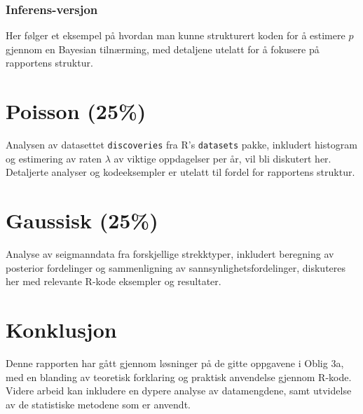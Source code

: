 \documentclass{article}
\begin{document}
\subsubsection*{Inferens-versjon}
Her følger et eksempel på hvordan man kunne strukturert koden for å estimere \(p\) gjennom en Bayesian tilnærming, med detaljene utelatt for å fokusere på rapportens struktur.

\section{Poisson (25\%)}
Analysen av datasettet \texttt{discoveries} fra R's \texttt{datasets} pakke, inkludert histogram og estimering av raten \(\lambda\) av viktige oppdagelser per år, vil bli diskutert her. Detaljerte analyser og kodeeksempler er utelatt til fordel for rapportens struktur.

\section{Gaussisk (25\%)}
Analyse av seigmanndata fra forskjellige strekktyper, inkludert beregning av posterior fordelinger og sammenligning av sannsynlighetsfordelinger, diskuteres her med relevante R-kode eksempler og resultater.

\section*{Konklusjon}
Denne rapporten har gått gjennom løsninger på de gitte oppgavene i Oblig 3a, med en blanding av teoretisk forklaring og praktisk anvendelse gjennom R-kode. Videre arbeid kan inkludere en dypere analyse av datamengdene, samt utvidelse av de statistiske metodene som er anvendt.
\end{document}
